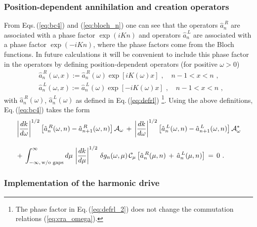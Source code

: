 
\subsubsection{Position-dependent annihilation and creation operators} \label{subsubsec:annihilation_creation}
%
From Eqs.\,(\ref{eq:bc4}) and (\ref{eq:bloch_n}) one can see that the 
operators $\hat{a}_n^{\,R}$ are associated with a phase factor $\exp(i K n)$ and 
operators $\hat{a}_n^{\,L}$ are associated with a phase factor $\exp(- i K n)$,
where the phase factors come from the Bloch functions.
In future calculations it will be convenient to include this phase factor in the 
operators by defining position-dependent operators (for positive $\omega>0$)
%
\begin{subequations} \label{eq:defrl_2}
\begin{eqnarray}
& \hat{a}_n^{\,R}(\omega,x) := \hat{a}_n^{\,R}(\omega) \exp\left[i K(\omega) x\right]  
\, \, , \quad n-1 < x < n \, \, , \\[2mm]
& \hat{a}_n^{\,L}(\omega,x) := \hat{a}_n^{\,L}(\omega) \exp\left[-i K(\omega) x\right] 
\, \, , \quad n-1 < x < n \, \, ,
\end{eqnarray}
\end{subequations}
%
with $\hat{a}_n^{\,R}(\omega)$, $\hat{a}_n^{\,L}(\omega)$ as defined in Eq.\,(\ref{eq:defrl})
%
\footnote{The phase factor in Eq.\,(\ref{eq:defrl_2}) does not change the 
commutation relations (\ref{eq:cra_omega}).}. 
%
Using the above definitions, Eq.\,(\ref{eq:bc4}) takes the form
%
\begin{equation} \label{eq:bc5}
\begin{split}
& \left| \frac{dk}{d\omega} \right|^{1/2} \left[ \hat{a}_n^{\,R}(\omega,n) - \hat{a}_{n+1}^{\,R}(\omega,n) \right] 
{\cal A}_{\omega} \, + \, 
\left| \frac{dk}{d\omega} \right|^{1/2} \left[ \hat{a}_n^{\,L}(\omega,n) - \hat{a}_{n+1}^{\,L}(\omega,n) \right] 
{\cal A}_{\omega}^* \\[3mm]
& + \, \int_{-\infty, \, \text{w/o gaps}}^{\infty} d\mu \, \left| \frac{dk}{d\mu} \right|^{1/2} \,
\delta g_n(\omega, \mu) \, {\cal C}_{\mu} 
\left[ \hat{a}_n^{\,R}(\mu,n) \, + \, \hat{a}_n^{\,L}(\mu,n) \right] \, = \, 0 \, \, .
\end{split}
\end{equation}
%





\subsubsection{Implementation of the harmonic drive} \label{subsubsec:harmonic_drive}

